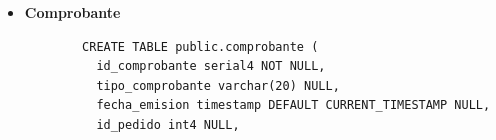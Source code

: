 \begin{itemize}
    \begin{listing}[H]
        \centering
        \begin{verbatim}
        CREATE TABLE public.producto (
          id_producto serial4 NOT NULL,
          nombre_producto varchar(100) NOT NULL,
          descripcion_producto text NULL,
          precio_producto numeric(10, 2) NOT NULL,
          id_categoria int4 NULL,
          CONSTRAINT producto_pkey PRIMARY KEY (id_producto),
          CONSTRAINT producto_id_categoria_fkey FOREIGN KEY (id_categoria) REFERENCES public.categoria(id_categoria)
        );
        \end{verbatim}
        \caption{Fragmento de código SQL para la creación de la tabla \texttt{producto}.}
        \label{lst:producto}
    \end{listing}
      \item \textbf{Comprobante}
    \begin{listing}[H]
        \centering
        \begin{verbatim}
        CREATE TABLE public.comprobante (
          id_comprobante serial4 NOT NULL,
          tipo_comprobante varchar(20) NULL,
          fecha_emision timestamp DEFAULT CURRENT_TIMESTAMP NULL,
          id_pedido int4 NULL,

\end{verbatim}
\end{listing}
\end{itemize}
